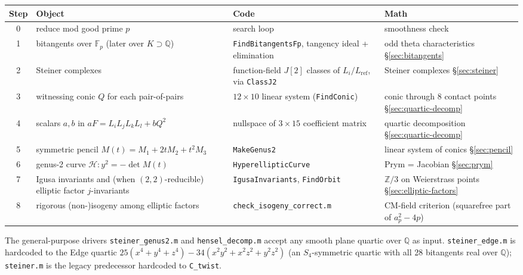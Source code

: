 \documentclass[11pt]{amsart}
\theoremstyle{plain}
\theoremstyle{definition}
\theoremstyle{remark}
\newcommand{\F}{\mathbb F}
\newcommand{\Q}{\mathbb Q}
\newcommand{\Z}{\mathbb Z}
\newcommand{\Hh}{\mathcal H}
\begin{document}
\begin{center}
\renewcommand{\arraystretch}{1.2}
\begin{tabular}{c >{\raggedright\arraybackslash}p{4.4cm} >{\raggedright\arraybackslash}p{4.0cm} >{\raggedright\arraybackslash}p{4.0cm}}
\toprule
Step & Object & Code & Math \\
\midrule
0 & reduce mod good prime $p$ & search loop & smoothness check \\
1 & 28 bitangents over $\F_p$ (later over $K \supset \Q$)
  & \texttt{FindBitangentsFp}, tangency ideal + elimination
  & odd theta characteristics \S\ref{sec:bitangents} \\
2 & 63 Steiner complexes
  & function-field $J[2]$ classes of $L_i / L_{\mathrm{ref}}$, via \texttt{ClassJ2}
  & Steiner complexes \S\ref{sec:steiner} \\
3 & witnessing conic $Q$ for each pair-of-pairs
  & $12 \times 10$ linear system (\texttt{FindConic})
  & conic through $8$ contact points \S\ref{sec:quartic-decomp} \\
4 & scalars $a, b$ in $a F = L_i L_j L_k L_l + b Q^2$
  & nullspace of $3 \times 15$ coefficient matrix
  & quartic decomposition \S\ref{sec:quartic-decomp} \\
5 & symmetric pencil $M(t) = M_1 + 2 t M_2 + t^2 M_3$
  & \texttt{MakeGenus2}
  & linear system of conics \S\ref{sec:pencil} \\
6 & genus-2 curve $\Hh : y^2 = -\det M(t)$
  & \texttt{HyperellipticCurve}
  & Prym = Jacobian \S\ref{sec:prym} \\
7 & Igusa invariants and (when $(2,2)$-reducible) elliptic factor $j$-invariants
  & \texttt{IgusaInvariants}, \texttt{FindOrbit}
  & $\Z/3$ on Weierstrass points \S\ref{sec:elliptic-factors} \\
8 & rigorous (non-)isogeny among elliptic factors
  & \texttt{check\_isogeny\_correct.m}
  & CM-field criterion (squarefree part of $a_p^2 - 4p$) \\
\bottomrule
\end{tabular}
\end{center}

The general-purpose drivers \texttt{steiner\_genus2.m} and
\texttt{hensel\_decomp.m} accept any smooth plane quartic over $\Q$ as
input. \texttt{steiner\_edge.m} is hardcoded to the Edge quartic
$25(x^4 + y^4 + z^4) - 34(x^2 y^2 + x^2 z^2 + y^2 z^2)$ (an $S_4$-symmetric
quartic with all 28 bitangents real over $\Q$); \texttt{steiner.m} is the
legacy predecessor hardcoded to \texttt{C\_twist}.
\end{document}
